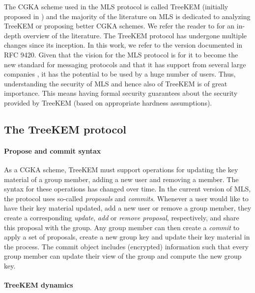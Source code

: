 The CGKA scheme used in the MLS protocol is called TreeKEM (initially proposed in \cite{treekem}) and the majority of the literature on MLS is dedicated to analyzing TreeKEM or proposing better CGKA schemes. We refer the reader to \cite[Section 1.3]{guillermo-thesis} for an in-depth overview of the literature. The TreeKEM protocol has undergone multiple changes since its inception. In this work, we refer to the version documented in RFC 9420. Given that the vision for the MLS protocol is for it to become the new standard for messaging protocols and that it has support from several large companies \cite{google-mls,mls-support}, it has the potential to be used by a huge number of users. Thus, understanding the security of MLS and hence also of TreeKEM is of great importance. This means having formal security guarantees about the security provided by TreeKEM (based on appropriate hardness assumptions).

\subsection{The TreeKEM protocol} \label{sec:treekem-overview}

\paragraph{Propose and commit syntax}

As a CGKA scheme, TreeKEM must support operations for updating the key material of a group member, adding a new user and removing a member. The syntax for these operations has changed over time. In the current version of MLS, the protocol uses so-called \emph{proposals} and \emph{commits}. Whenever a user would like to have their key material updated, add a new user or remove a group member, they create a corresponding \emph{update}, \emph{add} or \emph{remove proposal}, respectively, and share this proposal with the group. Any group member can then create a \emph{commit} to apply a set of proposals, create a new group key and update their key material in the process. The commit object includes (encrypted) information such that every group member can update their view of the group and compute the new group key.

\paragraph{TreeKEM dynamics}

